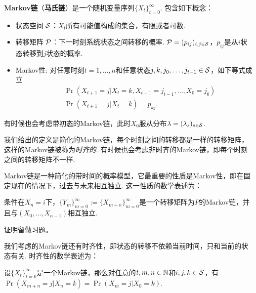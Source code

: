 \begin{definition}[Markov链]
\textbf{Markov链}（\textbf{马氏链}）是一个随机变量序列$\{X_t\}_{t=0}^{\infty}$. 包含如下概念：
\begin{itemize}
	\item 状态空间 $\MS$：$X_t$所有可能值构成的集合，有限或者可数.
	\item 转移矩阵 $\P$：下一时刻系统状态之间转移的概率. $\P=(p_{ij})_{i,j\in \MS}$，$p_{ij}$是从$i$状态转移到$j$状态的概率.
	\item Markov性: 对任意时刻$t=1,\dots,n$和任意状态$j,k,j_0,\dots,j_{t-1}\in \MS$，如下等式成立
		\begin{align*}
		   &\Pr(X_{t+1}=j| X_t=k,X_{t-1}=j_{t-1},\dots,X_0=j_0)\\
		   =& \Pr(X_{t+1}=j| X_{t}=k)=p_{kj}.
		\end{align*}
    \end{itemize}
    有时候也会考虑带初态的Markov链，此时$X_0$服从分布$\lambda=(\lambda_s)_{s\in \MS}$.
\end{definition}
我们给出的定义是简化的Markov链，每个时刻之间的转移都是一样的转移矩阵，这样的Markov链被称为\emph{时齐的}. 有时候也会考虑非时齐的Markov链，即每个时刻之间的转移矩阵不一样.

Markov链是一种简化的带时间的概率模型，它最重要的性质是Markov性，即在固定现在的情况下，过去与未来相互独立. 这一性质的数学表述为：
\begin{proposition}[Markov性]\label{prop:markov}
条件在$X_n=i$下，$\{Y_m\}_{m=0}^{\infty}:=\{X_{m+n}\}_{m=0}^{\infty}$是一个转移矩阵为$P$的Markov链，并且与$(X_0,\dots,X_{n-1})$相互独立. %
\end{proposition}
证明留做习题。

我们考虑的Markov链还有时齐性，即状态的转移不依赖当前时间，只和当前的状态有关. 时齐性的数学表述为：
\begin{proposition}
    设$\{X_t\}_{t=0}^{\infty}$是一个Markov链，那么对任意的$t,m,n\in \N$和$i,j,k\in \MS$，有
    $\Pr(X_{m+n}=j| X_{n}=k)=\Pr(X_{m}=j| X_{0}=k)$.
\end{proposition}

